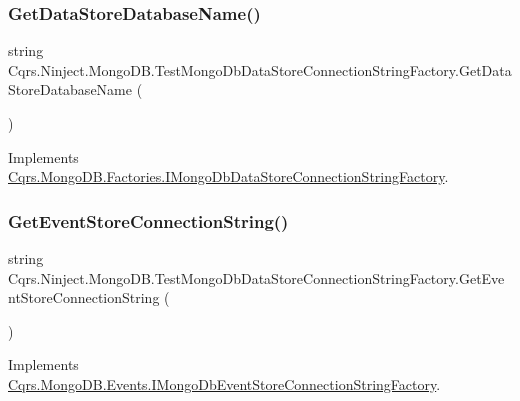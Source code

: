 \subsubsection{\texorpdfstring{Get\+Data\+Store\+Database\+Name()}{GetDataStoreDatabaseName()}}
{\footnotesize\ttfamily string Cqrs.\+Ninject.\+Mongo\+D\+B.\+Test\+Mongo\+Db\+Data\+Store\+Connection\+String\+Factory.\+Get\+Data\+Store\+Database\+Name (\begin{DoxyParamCaption}{ }\end{DoxyParamCaption})}



Implements \hyperlink{interfaceCqrs_1_1MongoDB_1_1Factories_1_1IMongoDbDataStoreConnectionStringFactory_aca9921fae4214a9eb22a221825c57363}{Cqrs.\+Mongo\+D\+B.\+Factories.\+I\+Mongo\+Db\+Data\+Store\+Connection\+String\+Factory}.

\mbox{\label{classCqrs_1_1Ninject_1_1MongoDB_1_1TestMongoDbDataStoreConnectionStringFactory_a3dcdc2262f3a39be8fdba16a6d09c523}} 
\subsubsection{\texorpdfstring{Get\+Event\+Store\+Connection\+String()}{GetEventStoreConnectionString()}}
{\footnotesize\ttfamily string Cqrs.\+Ninject.\+Mongo\+D\+B.\+Test\+Mongo\+Db\+Data\+Store\+Connection\+String\+Factory.\+Get\+Event\+Store\+Connection\+String (\begin{DoxyParamCaption}{ }\end{DoxyParamCaption})}



Implements \hyperlink{interfaceCqrs_1_1MongoDB_1_1Events_1_1IMongoDbEventStoreConnectionStringFactory_a3860ea4bf6793b081f03fb7cc1dcbb27}{Cqrs.\+Mongo\+D\+B.\+Events.\+I\+Mongo\+Db\+Event\+Store\+Connection\+String\+Factory}.


